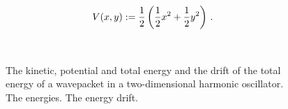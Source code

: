 \begin{equation}
  V(x,y) := \frac{1}{2} \left( \frac{1}{2} x^2 + \frac{1}{2} y^2 \right) \,.
\end{equation}

\begin{figure}
  \centering
   \\
  \caption[Energies of a wavepacket in an harmonic oscillator]
          {The kinetic, potential and total energy and the drift of the
           total energy of a wavepacket in a two-dimensional harmonic oscillator.
     The energies.
     The energy drift.
    \label{fig:ho_energy_plots}
  }
\end{figure}

